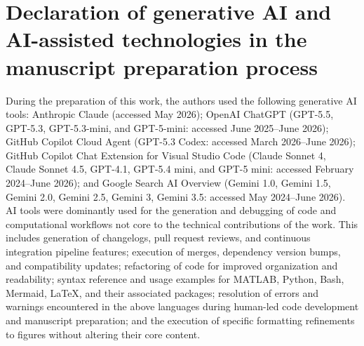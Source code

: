 \documentclass[a4paper,fleqn,colorlinks,unicode,lineno]{cas-dc} %
\begin{document}
\section*{Declaration of generative AI and AI-assisted technologies in the manuscript preparation process}
During the preparation of this work, the authors used the following generative AI tools:
Anthropic Claude (accessed May 2026);
OpenAI ChatGPT (GPT-5.5, GPT-5.3, GPT-5.3-mini, and GPT-5-mini: accessed June 2025--June 2026);
GitHub Copilot Cloud Agent (GPT-5.3 Codex: accessed March 2026--June 2026);
GitHub Copilot Chat Extension for Visual Studio Code (Claude Sonnet 4, Claude Sonnet 4.5, GPT-4.1, GPT-5.4 mini, and GPT-5 mini: accessed February 2024--June 2026); and
Google Search AI Overview (Gemini 1.0, Gemini 1.5, Gemini 2.0, Gemini 2.5, Gemini 3, Gemini 3.5: accessed May 2024--June 2026).
AI tools were dominantly used for the generation and debugging of code and computational workflows not core to the technical contributions of the work.
This includes generation of changelogs, pull request reviews, and continuous integration pipeline features;
execution of merges, dependency version bumps, and compatibility updates;
refactoring of code for improved organization and readability;
syntax reference and usage examples for MATLAB, Python, Bash, Mermaid, \LaTeX, and their associated packages;
resolution of errors and warnings encountered in the above languages during human-led code development and manuscript preparation;
and the execution of specific formatting refinements to figures without altering their core content.
\end{document}
